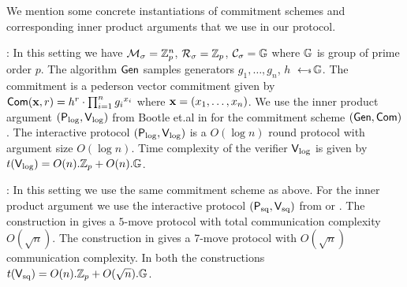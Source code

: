 We mention some concrete instantiations of commitment schemes and corresponding inner product arguments that we use in our protocol.

: In this setting we have $\mathcal{M}_\sigma=\mathbb{Z}^n_p$, $\mathcal{R}_\sigma=\mathbb{Z}_p$, $\mathcal{C}_\sigma=\mathbb{G}$ where $\mathbb{G}$ is group of prime order $p$. The algorithm $\mathsf{Gen}$ samples generators $g_1,\ldots,g_n$, $h$ $\hskip2.3pt{\gets\!\!\mbox{\tiny${\$}$\normalsize}}\, \mathbb{G}$. The commitment is a pederson vector commitment given by $\mathsf{Com}({\bf x } ,r ) = h^r \cdot \prod_{i=1}^n {g_i}^{x_i}$ where ${\bf x}=(x_1,\ldots,x_n)$. We use the inner product argument $(\mathsf{P}_\mathrm{log},\mathsf{V}_\mathrm{log})$ from Bootle et.al in \cite{Bulletproofs} for the commitment scheme $(\mathsf{Gen},\mathsf{Com})$. The interactive protocol $(\mathsf{P}_\mathrm{log},\mathsf{V}_\mathrm{log})$ is a $O(\log n)$ round protocol with argument size $O(\log n)$. Time complexity of the verifier $\mathsf{V}_\mathrm{log}$ is given by $t(\mathsf{V}_\mathrm{log})=O(n).\mathbb{Z}_p + O(n).\mathbb{G}$.\smallskip


: In this setting we use the same commitment scheme as above. For the inner product argument we use the interactive protocol $(\mathsf{P}_\mathrm{sq},\mathsf{V}_\mathrm{sq})$ from \cite{InnerProductDLS} or \cite{Groth09b}. The construction in \cite{InnerProductDLS} gives a $5$-move protocol with total communication complexity $O(\sqrt{n})$. The construction in \cite{Groth09b} gives a 7-move protocol with $O(\sqrt{n})$ communication complexity. In both the constructions $t(\mathsf{V}_\mathrm{sq}) = O(n).\mathbb{Z}_p +
O(\sqrt{n}).\mathbb{G}$.



